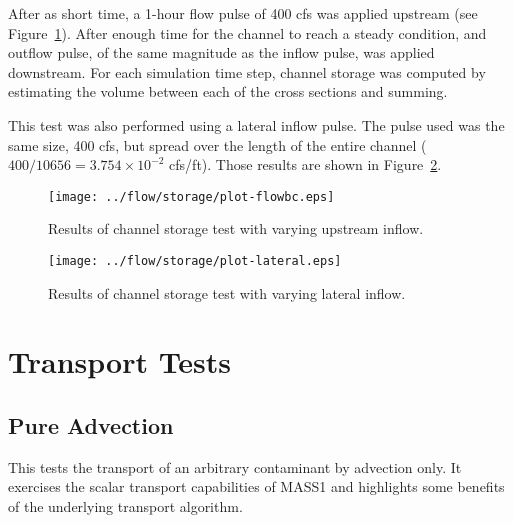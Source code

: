 \documentclass[12pt,dvips,letterpaper]{article}
\begin{document}
After as short time, a 1-hour flow pulse of 400 cfs was applied
upstream (see Figure~\ref{fig:test-storage-inflow}). After enough time
for the channel to reach a steady condition, and outflow pulse, of the
same magnitude as the inflow pulse, was applied downstream.  For each
simulation time step, channel storage was computed by estimating the
volume between each of the cross sections and summing.  

This test was also performed using a lateral inflow pulse.  The pulse
used was the same size, 400 cfs, but spread over the length of the
entire channel ($400 \slash 10656 = 3.754 \times 10^{-2}$
cfs/ft). Those results are shown in
Figure~\ref{fig:test-storage-lateral}. 


\begin{figure}[htbp]
  \begin{center}
    \texttt{[image: ../flow/storage/plot-flowbc.eps]}
    \caption{Results of channel storage test with varying upstream inflow.}
    \label{fig:test-storage-inflow}
  \end{center}
\end{figure}

\begin{figure}[htbp]
  \begin{center}
    \texttt{[image: ../flow/storage/plot-lateral.eps]}
    \caption{Results of channel storage test with varying lateral inflow.}
    \label{fig:test-storage-lateral}
  \end{center}
\end{figure}


\section{Transport Tests}
\label{sec:transport-tests}


\subsection{Pure Advection}
\label{sec:test-advection-1-link}

This tests the transport of an arbitrary contaminant by advection
only.  It exercises the scalar transport capabilities of MASS1 and
highlights some benefits of the underlying transport algorithm.  
\end{document}
